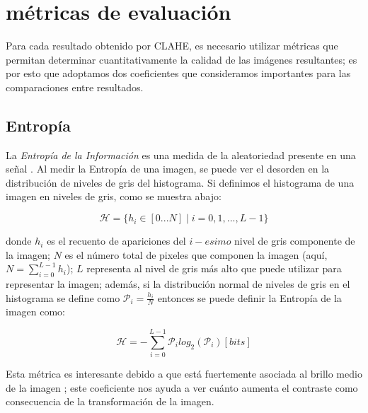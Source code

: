 \documentclass[spanish,twocolumn]{article}
\begin{document}
\section{métricas de evaluación}
\label{sec:metricas}

Para cada resultado obtenido por CLAHE, es necesario utilizar métricas que permitan determinar cuantitativamente la calidad de las imágenes resultantes; es por esto que adoptamos dos coeficientes que consideramos importantes para las comparaciones entre resultados.

\subsection{Entropía}
\label{ssec:entropia}

La {\it Entropía de la Información} es una medida de la aleatoriedad presente en una señal \cite{tsai2008information}. Al medir la Entropía de una imagen, se puede ver el desorden en la distribución de niveles de gris del histograma. Si definimos el histograma de una imagen en niveles de gris, como se muestra abajo: 

\begin{equation}\label{eq:histograma}
    \mathcal{H}=\{h_i \in [0...N]\mid i=0,1,...,L-1\}
\end{equation}

donde $h_i$ es el recuento de apariciones del $i-esimo$ nivel de gris componente de la imagen; $N$ es el número total de pixeles que componen la imagen (aquí, $N=\sum_{i=0}^{L-1}h_i$); $L$ representa al nivel de gris más alto que puede utilizar para representar la imagen;  además, si la distribución normal de niveles de gris en el histograma se define como $\mathcal{P}_i=\frac{h_i}{N}$ entonces se puede definir la Entropía de la imagen como:



\begin{equation}\label{eq:entropia}
\mathscr{H}=-\sum_{i=0}^{L-1}\mathcal{P}_i log_2(\mathcal{P}_i) [bits]
\end{equation}

Esta métrica es interesante debido a que está fuertemente asociada al brillo medio de la imagen \cite{108593}; este coeficiente nos ayuda a ver cuánto aumenta el contraste como consecuencia de la transformación de la imagen.
\end{document}
